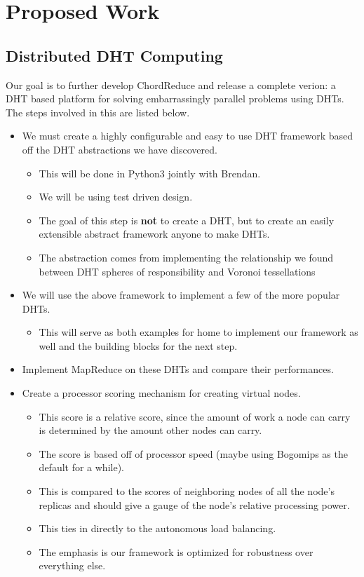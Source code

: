 \chapter{Proposed Work}

\section{Distributed DHT Computing}




Our goal is to further develop ChordReduce and release a complete verion: a DHT based platform for solving embarrassingly parallel problems using DHTs.
The steps involved in this are listed below.

\begin{itemize}
	\item We must create a highly configurable and easy to use DHT framework based off the DHT abstractions we have discovered.
	\begin{itemize}
		\item This will be done in Python3 jointly with Brendan.
		\item We will be using test driven design.
		\item The goal of this step is \textbf{not} to create a DHT, but to create an easily extensible abstract framework anyone to make DHTs.
		\item The abstraction comes from implementing the relationship we found between DHT spheres of responsibility and Voronoi tessellations
	\end{itemize}
	\item We will use the above framework to implement a few of the more popular DHTs.
	\begin{itemize}
		\item This will serve as both examples for home to implement our framework as well and the building blocks for the next step.
	\end{itemize}
	\item Implement MapReduce on these DHTs and compare their performances.
	\item Create a  processor scoring mechanism for creating virtual nodes.
	\begin{itemize}
		\item This score is a relative score, since the amount of work a node can carry is determined by the amount other nodes can carry.
		\item The score is based off of processor speed (maybe using Bogomips as the default for a while).
		\item This is compared to the scores of neighboring nodes  of all the node's replicas and should give a gauge of the node's relative processing power.
		\item This ties in directly to the autonomous load balancing.
	\end{itemize}
	\begin{itemize}
		\item The emphasis is our framework is optimized for robustness over everything else.
	\end{itemize}
	
\end{itemize}
